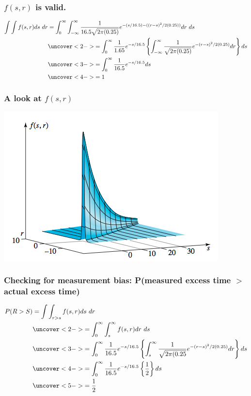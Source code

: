 \documentclass[handout]{beamer}\usepackage{graphicx, color}
\numberwithin{equation}{section}
\begin{document}
\begin{frame}
\frametitle{$f(s, r)$ is valid.} \scriptsize

\begin{align*}
\int \int f(s, r) ds \ dr &= \int_0^\infty \int_{-\infty}^\infty \frac{1}{16.5 \sqrt{2 \pi (0.25)}} e^{-(s/16.5) - ((r-s)^2/2(0.25))} dr \ ds \\
& \uncover<2->{= \int_0^\infty \frac{1}{1.65} e^{-s/16.5} \left \{ \int_{-\infty}^\infty \frac{1}{\sqrt{2 \pi (0.25)}} e^{-(r-s)^2/2(0.25)} dr \right \} ds} \\
&\uncover<3->{= \int_0^\infty \frac{1}{16.5} e^{-s/16.5} ds} \\
&\uncover<4->{= 1}
\end{align*}
\end{frame}

\begin{frame}
\frametitle{A look at $f(s,r)$}
 \includegraphics{../../fig/salespict.png}
\end{frame}

\begin{frame}
\frametitle{\small Checking for measurement bias: P(measured excess time $>$ actual excess time)} \scriptsize
\begin{align*}
P(R > S) &= \int \int_{r > s} f(s, r) ds \ dr  \\
&\uncover<2->{= \int_0^\infty \int_s^\infty f(s,r) dr \ ds } \\
&\uncover<3->{= \int_0^\infty \frac{1}{16.5} e^{-s/16.5} \left \{ \int_{s}^\infty \frac{1}{\sqrt{2 \pi (0.25}} e^{-(r-s)^2/2(0.25)} dr \right \} ds} \\
&\uncover<4->{=\int_0^\infty \frac{1}{16.5} e^{-s/16.5} \left \{ \frac{1}{2} \right \} ds} \\
&\uncover<5->{=\frac{1}{2}}
\end{align*}
\end{frame}
\end{document}

